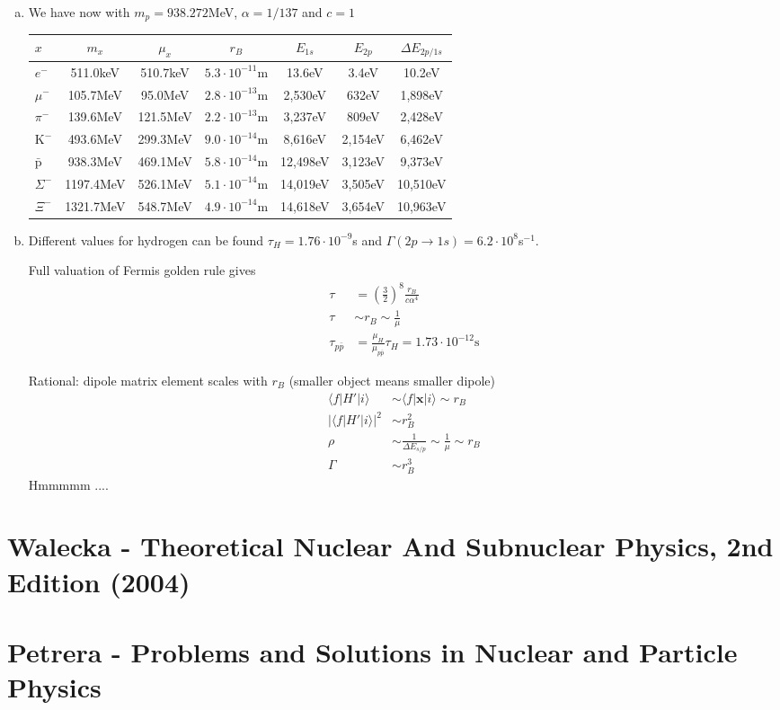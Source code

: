 \documentclass[../main.tex]{subfiles}
\begin{document}
\begin{enumerate}[(a)]
\item We have now with $m_p=938.272$MeV, $\alpha=1/137$ and $c=1$ 
\begin{center}
\begin{tabular}{lcccccc}
$x$              & $m_x$       & $\mu_x$ & $r_B$ & $E_{1s}$ & $E_{2p}$ & $\Delta E_{2p/1s}$ \\ \hline
$e^-$            & 511.0keV  & 510.7keV & $5.3\cdot10^{-11}$m &   13.6eV &   3.4eV &  10.2eV\\
$\mu^-$          & 105.7MeV  &  95.0MeV & $2.8\cdot10^{-13}$m &  2,530eV &   632eV & 1,898eV\\
$\pi^-$          & 139.6MeV  & 121.5MeV & $2.2\cdot10^{-13}$m &  3,237eV &   809eV & 2,428eV\\
$\text{K}^-$     & 493.6MeV  & 299.3MeV & $9.0\cdot10^{-14}$m &  8,616eV & 2,154eV & 6,462eV\\
$\bar{\text{p}}$ & 938.3MeV  & 469.1MeV & $5.8\cdot10^{-14}$m & 12,498eV & 3,123eV & 9,373eV\\
$\Sigma^-$       & 1197.4MeV & 526.1MeV & $5.1\cdot10^{-14}$m & 14,019eV & 3,505eV & 10,510eV\\
$\Xi^-$          & 1321.7MeV & 548.7MeV & $4.9\cdot10^{-14}$m & 14,618eV & 3,654eV & 10,963eV
\end{tabular}
\end{center}

\item Different values for hydrogen can be found $\tau_H=1.76\cdot10^{-9}$s and $\Gamma(2p\rightarrow1s) =6.2\cdot10^8$s$^{-1}$.

Full valuation of Fermis golden rule gives
\begin{align}
\tau&=\left(\frac{3}{2}\right)^8\frac{r_B}{c\alpha^4}\\
\tau&\sim r_B\sim\frac{1}{\mu}\\
\tau_{p\bar{p}}&=\frac{\mu_H}{\mu_{p\bar{p}}}\tau_H=1.73\cdot10^{-12}\text{s}
\end{align}

Rational: dipole matrix element scales with $r_B$ (smaller object means smaller dipole)
\begin{align}
\langle f|H'|i\rangle &\sim \langle f|\mathbf{x}|i\rangle\sim r_B\\
|\langle f|H'|i\rangle|^2 &\sim r_B^2\\
\rho&\sim \frac{1}{\Delta E_{s/p}}\sim\frac{1}{\mu}\sim r_B\\
\Gamma&\sim r_B^3
\end{align}
Hmmmmm ....

\end{enumerate}

\section{{\sc Walecka} - Theoretical Nuclear And Subnuclear Physics, 2nd Edition (2004)}

\section{{\sc Petrera} - Problems and Solutions in Nuclear and Particle Physics}
\end{document}
